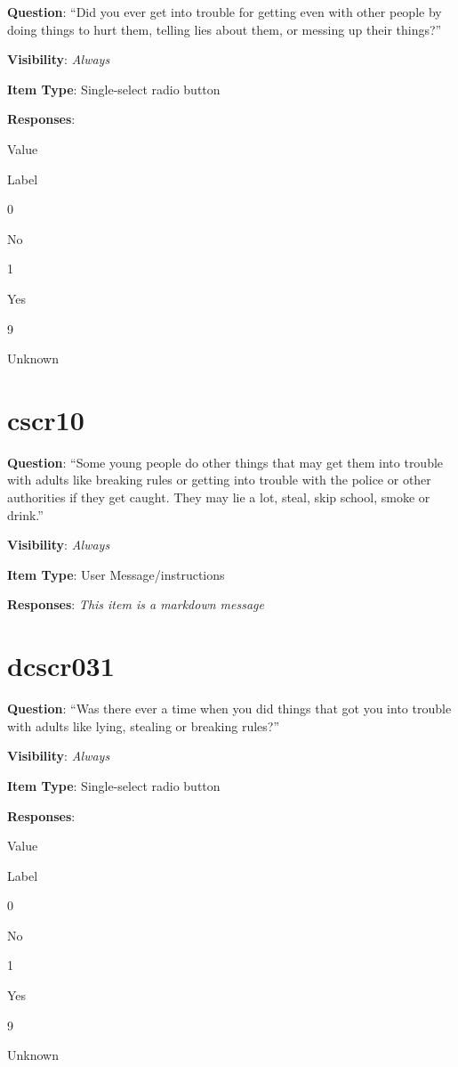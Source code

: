 \documentclass[]{book}
\begin{document}
\textbf{Question}: ``Did you ever get into trouble for getting even with other people by doing things to hurt them, telling lies about them, or messing up their things?''

\textbf{Visibility}: \emph{Always}

\textbf{Item Type}: Single-select radio button

\textbf{Responses}:

Value

Label

0

No

1

Yes

9

Unknown

\hypertarget{cscr10}{%
\section{cscr10}\label{cscr10}}

\textbf{Question}: ``Some young people do other things that may get them into trouble with adults like breaking rules or getting into trouble with the police or other authorities if they get caught. They may lie a lot, steal, skip school, smoke or drink.''

\textbf{Visibility}: \emph{Always}

\textbf{Item Type}: User Message/instructions

\textbf{Responses}: \emph{This item is a markdown message}

\hypertarget{dcscr031}{%
\section{dcscr031}\label{dcscr031}}

\textbf{Question}: ``Was there ever a time when you did things that got you into trouble with adults like lying, stealing or breaking rules?''

\textbf{Visibility}: \emph{Always}

\textbf{Item Type}: Single-select radio button

\textbf{Responses}:

Value

Label

0

No

1

Yes

9

Unknown
\end{document}
